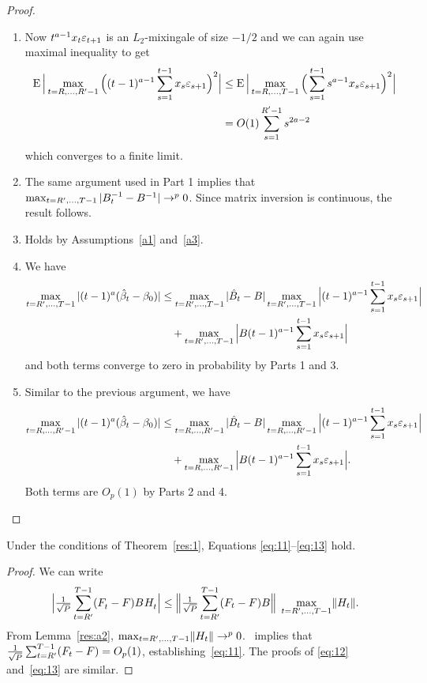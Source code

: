 \documentclass[12pt,fleqn]{article}
\providecommand\phantomsection{}
\begin{document}
\begin{proof}
\begin{enumerate}
  \item Now $t^{a-1} x_t \varepsilon_{t+1}$ is an $L_2$-mixingale of size
    $-1/2$ and we can again use  maximal inequality to get
    \begin{align*}
      \operatorname{E} \Big\lvert \max_{t=R,\dots,R'-1} \Big((t-1)^{a - 1} \sum_{s=1}^{t-1} x_s \varepsilon_{s+1} \Big)^2 \Big\rvert
      &\leq \operatorname{E} \Big\lvert \max_{t=R,\dots,T-1} \Big(\sum_{s=1}^{t-1} s^{a-1} x_s \varepsilon_{s+1} \Big)^2 \Big\rvert \\
      &= O(1) \sum_{s=1}^{R'-1} s^{2a - 2}
    \end{align*}
    which converges to a finite limit.
  \item The same argument used in Part 1 implies that $\max_{t=R',\dots,T-1} |
    B_t^{-1} - B^{-1}| \to^p 0$. Since matrix inversion is continuous,
    the result follows.
  \item Holds by Assumptions~\ref{a1} and~\ref{a3}.
  \item We have
    \begin{align*}
      \omaxb{t} | (t-1)^a (\hat{\beta}_t - \btrue) |
      &\leq \omaxb{t} |\hat{B}_t - B|
      \omaxb{t} \Big|(t-1)^{a-1} \sum_{s=1}^{t-1} x_s \ep_{s+1} \Big| \\
      &\quad + \omaxb{t} \Big| B (t-1)^{a-1} \sum_{s=1}^{t-1} x_s \ep_{s+1} \Big|
    \end{align*}
    and both terms converge to zero in probability by Parts 1 and 3.
  \item Similar to the previous argument, we have
    \begin{align*}
      \omaxc{t} | (t-1)^a (\hat{\beta}_t - \btrue) |
      & \leq \omaxc{t} | \hat{B}_t - B | \omaxc{t} \Big|(t-1)^{a-1} \sum_{s=1}^{t-1} x_s \ep_{s+1} \Big| \\
      &\quad + \omaxc{t} \Big| B (t-1)^{a-1} \sum_{s=1}^{t-1} x_s \ep_{s+1} \Big|.
    \end{align*}
    Both terms are $O_p(1)$ by Parts 2 and 4. \qedhere
  \end{enumerate}
\end{proof}

\phantomsection
{}
\begin{alem}\label{res:a4}
  Under the conditions of Theorem~\ref{res:1}, Equations
  \eqref{eq:11}--\eqref{eq:13} hold.
\end{alem}

\begin{proof}
We can write
\begin{equation*}
  \Big\lvert \tfrac{1}{\sqrt{P}} \sum_{t=R'}^{T-1} (F_t^{} - F) B^{} H_t^{} \Big\rvert \leq
  \Big\lVert \tfrac{1}{\sqrt{P}} \sum_{t=R'}^{T-1} (F_t - F) B \Big\rVert \;
  \max_{t=R',\dots,T-1} \lVert H_t \rVert.
\end{equation*}
From Lemma~\ref{res:a2}, $\max_{t=R',\dots,T-1} \lVert H_t \rVert \to^p
0$.  \clt\ implies that $\tfrac{1}{\sqrt{P}} \sum_{t=R'}^{T-1} (F_t - F) =
O_p(1)$, establishing~\eqref{eq:11}. The proofs of \eqref{eq:12}
and~\eqref{eq:13} are similar.
\end{proof}

\setcounter{secnumdepth}{1}

\end{document}
